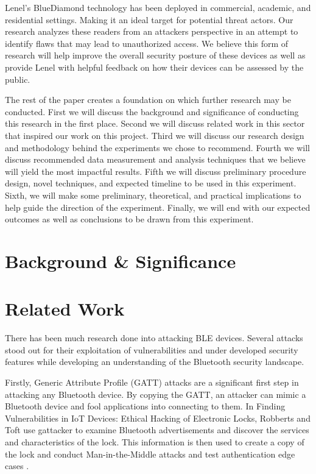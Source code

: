 \documentclass[10pt,twocolumn,letterpaper]{article}
\begin{document}
Lenel's BlueDiamond technology has been deployed in commercial, academic, and residential settings. Making it an ideal target for potential threat actors. Our research analyzes these readers from an attackers perspective in an attempt to identify flaws that may lead to unauthorized access. We believe this form of research will help improve the overall security posture of these devices as well as provide Lenel with helpful feedback on how their devices can be assessed by the public.

The rest of the paper creates a foundation on which further research may be conducted. First we will discuss the background and significance of conducting this research in the first place. Second we will discuss related work in this sector that inspired our work on this project. Third we will discuss our research design and methodology behind the experiments we chose to recommend. Fourth we will discuss recommended data measurement and analysis techniques that we believe will yield the most impactful results. Fifth we will discuss preliminary procedure design, novel techniques, and expected timeline to be used in this experiment. Sixth, we will make some preliminary, theoretical, and practical implications to help guide the direction of the experiment. Finally, we will end with our expected outcomes as well as conclusions to be drawn from this experiment.

\section{Background \& Significance}

\section{Related Work}
There has been much research done into attacking BLE devices. Several attacks stood out for their exploitation of vulnerabilities and under developed security features while developing an understanding of the Bluetooth security landscape.

Firstly, Generic Attribute Profile (GATT) attacks are a significant first step in attacking any Bluetooth device. By copying the GATT, an attacker can mimic a Bluetooth device and fool applications into connecting to them. In Finding Vulnerabilities in IoT Devices: Ethical Hacking of Electronic Locks, Robberts and Toft use gattacker to examine Bluetooth advertisements and discover the services and characteristics of the lock. This information is then used to create a copy of the lock and conduct Man-in-the-Middle attacks and test authentication edge cases \cite{KTH}.
\end{document}
